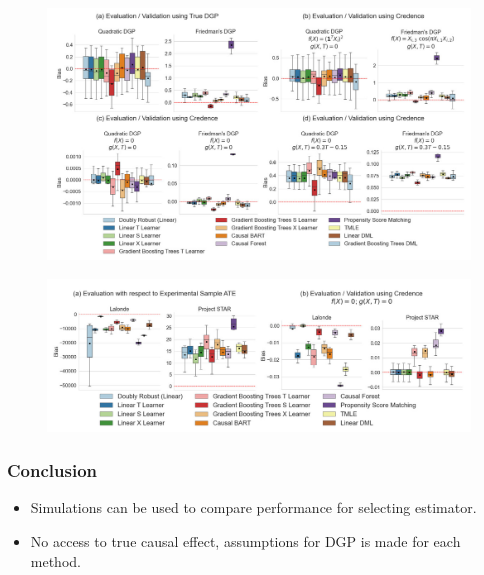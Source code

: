 \documentclass{beamer}
\begin{document}
\begin{frame}
	\begin{figure}
		\includegraphics[width=\textwidth]{fig_3.jpg}
	\end{figure}
\end{frame}
\begin{frame}
	\begin{figure}
		\includegraphics[width=\textwidth]{fig_4.jpg}
	\end{figure}
\end{frame}

\begin{frame}
	\frametitle{Conclusion}
	\begin{itemize}
		\item Simulations can be used to compare performance for selecting estimator.
		\item No access to true causal effect, assumptions for DGP is made for each method.
	\end{itemize}
\end{frame}
\end{document}

